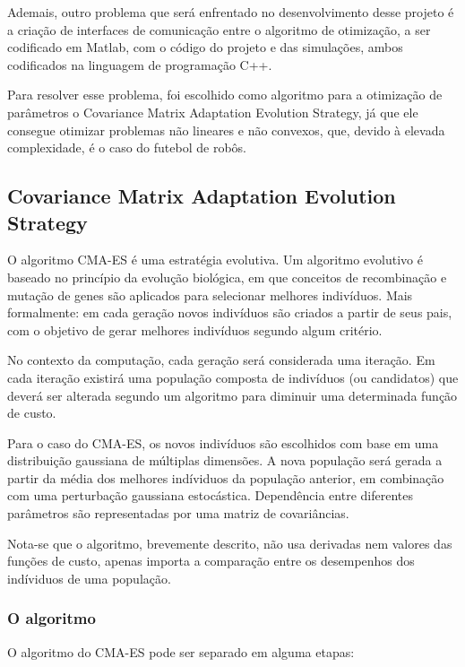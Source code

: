 \documentclass[10pt,fleqn,a4paper]{article}
\begin{document}
Ademais, outro problema que será enfrentado no desenvolvimento desse projeto é a criação de interfaces de comunicação entre o algoritmo de otimização, a ser codificado em Matlab, com o código do projeto e das simulações, ambos codificados na linguagem de programação C++.

Para resolver esse problema, foi escolhido como algoritmo para a otimização de parâmetros o Covariance Matrix Adaptation Evolution Strategy, já que ele consegue otimizar problemas não lineares e não convexos, que, devido à elevada complexidade, é o caso do futebol de robôs.

\subsection{Covariance Matrix Adaptation Evolution Strategy}

O algoritmo CMA-ES é uma estratégia evolutiva. Um algoritmo evolutivo é baseado no princípio da evolução biológica, em que conceitos de recombinação e mutação de genes são aplicados para selecionar melhores indivíduos. Mais formalmente: em cada geração novos indivíduos são criados a partir de seus pais, com o objetivo de gerar melhores indivíduos segundo algum critério.

No contexto da computação, cada geração será considerada uma iteração. Em cada iteração existirá uma população composta de indivíduos (ou candidatos) que deverá ser alterada segundo um algoritmo para diminuir uma determinada função de custo. 

Para o caso do CMA-ES, os novos indivíduos são escolhidos com base em uma distribuição gaussiana de múltiplas dimensões. A nova população será gerada a partir da média dos melhores indíviduos da população anterior, em combinação com uma perturbação gaussiana estocástica. Dependência entre diferentes parâmetros são representadas por uma matriz de covariâncias.

Nota-se que o algoritmo, brevemente descrito, não usa derivadas nem valores das funções de custo, apenas importa a comparação entre os desempenhos dos indíviduos de uma população.

\subsubsection{O algoritmo}

O algoritmo do CMA-ES pode ser separado em alguma etapas:
\end{document}

